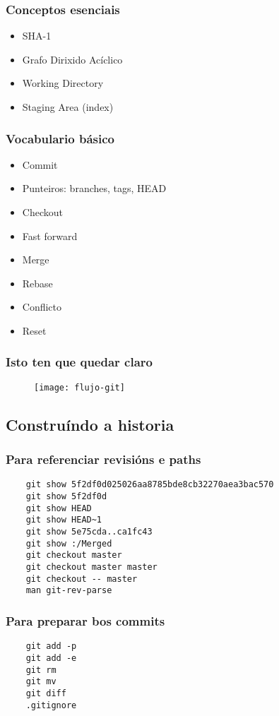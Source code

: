 \begin{frame}
  \frametitle{Conceptos esenciais}
  \begin{itemize}
    \item SHA-1
    \item Grafo Dirixido Acíclico
    \item Working Directory
    \item Staging Area (index)
  \end{itemize}
\end{frame}

\begin{frame}
  \frametitle{Vocabulario básico}
  \begin{itemize}
    \item Commit
    \item Punteiros: branches, tags, HEAD
    \item Checkout
    \item Fast forward
    \item Merge
    \item Rebase
    \item Conflicto
    \item Reset
  \end{itemize}
\end{frame}

\begin{frame}
  \frametitle{Isto ten que quedar claro}
  \begin{figure}[ht]
    \centering
    \texttt{[image: flujo-git]}
  \end{figure}
\end{frame}

\subsection{Construíndo a historia}
\label{subsec:Historia}

\begin{frame}[fragile]
  \frametitle{Para referenciar revisións e paths}
\begin{verbatim}
	git show 5f2df0d025026aa8785bde8cb32270aea3bac570
	git show 5f2df0d
	git show HEAD
	git show HEAD~1
	git show 5e75cda..ca1fc43
	git show :/Merged
	git checkout master
	git checkout master master
	git checkout -- master
	man git-rev-parse
\end{verbatim}
\end{frame}

\begin{frame}[fragile]
  \frametitle{Para preparar bos commits}
\begin{verbatim}
	git add -p
	git add -e
	git rm
	git mv
	git diff
	.gitignore
\end{verbatim}
\end{frame}

